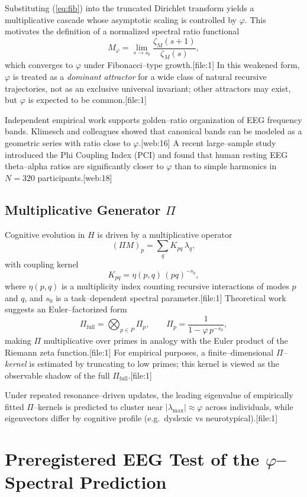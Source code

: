 \documentclass[11pt]{article}
\begin{document}
Substituting (\ref{eq:fib}) into the truncated Dirichlet transform yields a multiplicative cascade whose asymptotic scaling is controlled by $\varphi$.
This motivates the definition of a normalized spectral ratio functional
\[
M_{\varphi} = \lim_{s \to s_{0}}
  \frac{\zeta_{M}(s+1)}{\zeta_{M}(s)},
\]
which converges to $\varphi$ under Fibonacci--type growth.[file:1]
In this weakened form, $\varphi$ is treated as a \emph{dominant attractor} for a wide class of natural recursive trajectories, not as an exclusive universal invariant; other attractors may exist, but $\varphi$ is expected to be common.[file:1]

Independent empirical work supports golden--ratio organization of EEG frequency bands.
Klimesch and colleagues showed that canonical bands can be modeled as a geometric series with ratio close to $\varphi$.\cite{Pletzer2010,Klimesch2013}[web:16]
A recent large--sample study introduced the Phi Coupling Index (PCI) and found that human resting EEG theta--alpha ratios are significantly closer to $\varphi$ than to simple harmonics in $N=320$ participants.\cite{GoldenEEG2026}[web:18]

\subsection{Multiplicative Generator $\Pi$}

Cognitive evolution in $H$ is driven by a multiplicative operator
\[
(\Pi M)_{p} = \sum_{q} K_{pq}\,\lambda_{q},
\]
with coupling kernel
\[
K_{pq} = \eta(p,q)\,(pq)^{-s_{0}},
\]
where $\eta(p,q)$ is a multiplicity index counting recursive interactions of modes $p$ and $q$, and $s_{0}$ is a task--dependent spectral parameter.[file:1]
Theoretical work suggests an Euler--factorized form
\[
\Pi_{\mathrm{full}} = \bigotimes_{p \in P} \Pi_{p},\qquad
\Pi_{p} = \frac{1}{1 - \varphi\,p^{-s_{0}}},
\]
making $\Pi$ multiplicative over primes in analogy with the Euler product of the Riemann zeta function.[file:1]
For empirical purposes, a finite--dimensional \emph{$\Pi$--kernel} is estimated by truncating to low primes; this kernel is viewed as the observable shadow of the full $\Pi_{\mathrm{full}}$.[file:1]

Under repeated resonance--driven updates, the leading eigenvalue of empirically fitted $\Pi$--kernels is predicted to cluster near $|\lambda_{\max}|\approx \varphi$ across individuals, while eigenvectors differ by cognitive profile (e.g.\ dyslexic vs neurotypical).[file:1]

\section{Preregistered EEG Test of the $\varphi$--Spectral Prediction}
\end{document}
